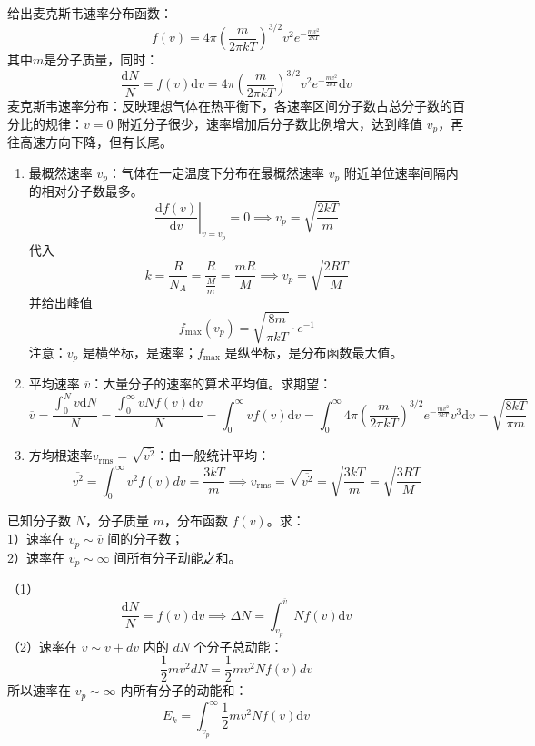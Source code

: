 \documentclass[lang=cn,11pt]{elegantbook}
\begin{document}
\begin{definition}[三种统计速率]
给出麦克斯韦速率分布函数：
\[
f(v)=4\pi\left(\frac{m}{2\pi kT}\right)^{3/2}v^2e^{-\frac{mv^2}{2kT}}
\]其中$m$是分子质量，同时：
\[\frac{\mathrm dN}{N}=f(v)\mathrm dv=4\pi\left(\frac{m}{2\pi kT}\right)^{3/2}v^2e^{-\frac{mv^2}{2kT}}\mathrm dv\]麦克斯韦速率分布：反映理想气体在热平衡下，各速率区间分子数占总分子数的百分比的规律：\(v=0\) 附近分子很少，速率增加后分子数比例增大，达到峰值 \(v_p\)，再往高速方向下降，但有长尾。
\begin{enumerate}
    \item 最概然速率 \(v_p\)：气体在一定温度下分布在最概然速率 \(v_p\) 附近单位速率间隔内的相对分子数最多。
    \[\left.\frac{\mathrm df(v)}{\mathrm dv}\right|_{v=v_p}=0\implies v_p=\sqrt{\frac{2kT}{m}}\]代入
    \[k=\frac{R}{N_A}=\frac{R}{\frac{M}{m}}=\frac{mR}{M}\implies v_p=\sqrt{\frac{2RT}{M}}\]并给出峰值\[f_{\max}(v_p)=\sqrt{\frac{8m}{\pi kT}}\cdot e^{-1}\]注意：\(v_p\) 是横坐标，是速率；\(f_{\max}\) 是纵坐标，是分布函数最大值。
    \item 平均速率 \(\overline v\)：大量分子的速率的算术平均值。求期望：
\[\overline v=\frac{\int_0^N v\mathrm dN}{N}=\frac{\int_0^\infty vNf(v)\mathrm dv}{N}=\int_0^\infty vf(v)\mathrm dv=\int_0^\infty 4\pi\left(\frac{m}{2\pi kT}\right)^{3/2}e^{-\frac{mv^2}{2kT}}v^3\mathrm dv=\sqrt{\frac{8kT}{\pi m}}\]
\item 方均根速率\(v_{\text{rms}}=\sqrt{\overline{v^2}}\)：由一般统计平均：
\[\overline{v^2}=\int_0^\infty v^2f(v)dv=\frac{3kT}{m}\implies v_{\text{rms}}=\sqrt{\overline{v^2}}=\sqrt{\frac{3kT}{m}}=\sqrt{\frac{3RT}{M}}\]
\end{enumerate}
\end{definition}

\begin{exercise}
已知分子数 \(N\)，分子质量 \(m\)，分布函数 \(f(v)\)。求：\\
1）速率在 \(v_p\sim \overline v\) 间的分子数；\\
2）速率在 \(v_p\sim\infty\) 间所有分子动能之和。
\end{exercise}
\begin{solution}
（1）\[\frac{\mathrm dN}{N}=f(v)\mathrm dv\implies \Delta N=\int_{v_p}^{\overline v}Nf(v)\mathrm dv\]
（2）速率在 \(v\sim v+dv\) 内的 \(dN\) 个分子总动能：\[\frac12mv^2dN=\frac12mv^2Nf(v)dv\]所以速率在 \(v_p\sim\infty\) 内所有分子的动能和：\[E_k=\int_{v_p}^{\infty}\frac12mv^2Nf(v)\mathrm dv\]
\end{solution}
\end{document}
